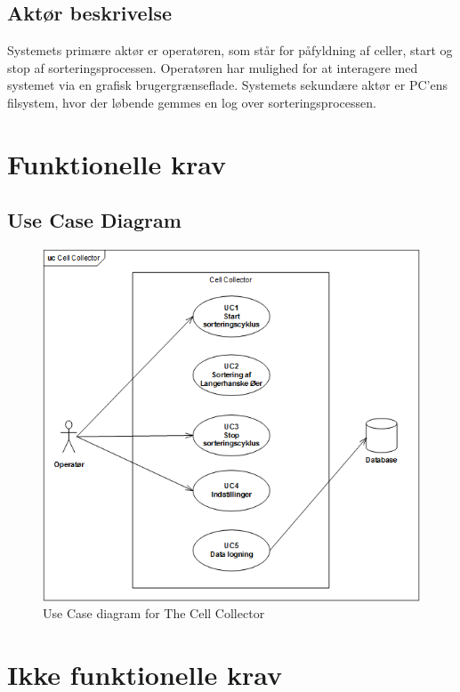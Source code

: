 \subsection{Aktør beskrivelse}
Systemets primære aktør er operatøren, som står for påfyldning af celler, start og stop af sorteringsprocessen. Operatøren har mulighed for at interagere med systemet via en grafisk brugergrænseflade. Systemets sekundære aktør er PC’ens filsystem, hvor der løbende gemmes en log over sorteringsprocessen.
\section{Funktionelle krav}

\subsection{Use Case Diagram}
\begin{figure}[H]
	\centering
	\includegraphics[width=1\textwidth]{billeder/UC_CellCollector.png}
	\caption{Use Case diagram for The Cell Collector}
	\label{fig:usecase}
\end{figure}
\newpage






\section{Ikke funktionelle krav}


\newpage

\newpage
